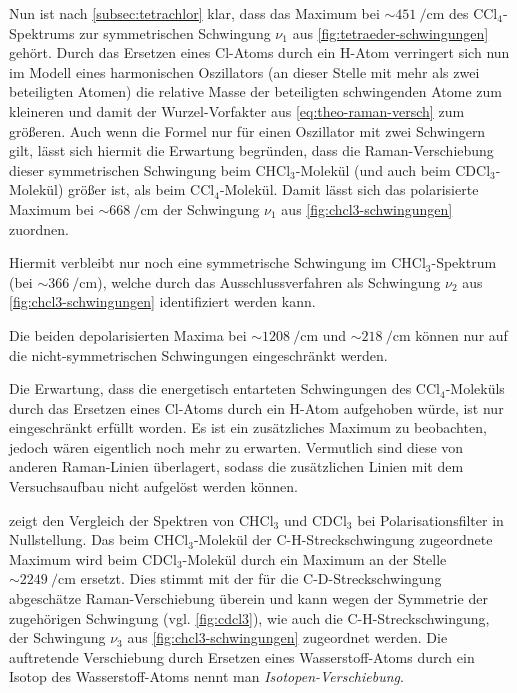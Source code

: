 \documentclass[../bericht.tex]{subfiles}
\begin{document}
        Nun ist nach \cref{subsec:tetrachlor} klar, dass das Maximum bei $\sim\SI{451}{\per\centi\meter}$ des $\mathrm{CCl_4}$-Spektrums zur symmetrischen Schwingung $\nu_1$ aus \cref{fig:tetraeder-schwingungen} gehört. Durch das Ersetzen eines Cl-Atoms durch ein H-Atom verringert sich nun im Modell eines harmonischen Oszillators (an dieser Stelle mit mehr als zwei beteiligten Atomen) die relative Masse der beteiligten schwingenden Atome zum kleineren und damit der Wurzel-Vorfakter aus \cref{eq:theo-raman-versch} zum größeren. Auch wenn die Formel nur für einen Oszillator mit zwei Schwingern gilt, lässt sich hiermit die Erwartung begründen, dass die Raman-Verschiebung dieser symmetrischen Schwingung beim $\mathrm{CHCl_3}$-Molekül (und auch beim $\mathrm{CDCl_3}$-Molekül) größer ist, als beim $\mathrm{CCl_4}$-Molekül. Damit lässt sich das polarisierte Maximum bei $\sim\SI{668}{\per\centi\meter}$ der Schwingung $\nu_1$ aus \cref{fig:chcl3-schwingungen} zuordnen.

        Hiermit verbleibt nur noch eine symmetrische Schwingung im $\mathrm{CHCl_3}$-Spektrum (bei $\sim\SI{366}{\per\centi\meter}$), welche durch das Ausschlussverfahren als Schwingung $\nu_2$ aus \cref{fig:chcl3-schwingungen} identifiziert werden kann.

        Die beiden depolarisierten Maxima bei $\sim\SI{1208}{\per\centi\meter}$ und $\sim\SI{218}{\per\centi\meter}$ können nur auf die nicht-symmetrischen Schwingungen eingeschränkt werden.

        Die Erwartung, dass die energetisch entarteten Schwingungen des $\mathrm{CCl_4}$-Moleküls durch das Ersetzen eines Cl-Atoms durch ein H-Atom aufgehoben würde, ist nur eingeschränkt erfüllt worden. Es ist ein zusätzliches Maximum zu beobachten, jedoch wären eigentlich noch mehr zu erwarten. Vermutlich sind diese von anderen Raman-Linien überlagert, sodass die zusätzlichen Linien mit dem Versuchsaufbau nicht aufgelöst werden können.
        \medskip

         zeigt den Vergleich der Spektren von $\mathrm{CHCl_3}$ und $\mathrm{CDCl_3}$ bei Polarisationsfilter in Nullstellung. Das beim $\mathrm{CHCl_3}$-Molekül der C-H-Streckschwingung zugeordnete Maximum wird beim $\mathrm{CDCl_3}$-Molekül durch ein Maximum an der Stelle $\sim\SI{2249}{\per\centi\meter}$ ersetzt. Dies stimmt mit der für die C-D-Streckschwingung abgeschätze Raman-Verschiebung überein und kann wegen der Symmetrie der zugehörigen Schwingung (vgl. \cref{fig:cdcl3}), wie auch die C-H-Streckschwingung, der Schwingung $\nu_3$ aus \cref{fig:chcl3-schwingungen} zugeordnet werden. Die auftretende Verschiebung durch Ersetzen eines Wasserstoff-Atoms durch ein Isotop des Wasserstoff-Atoms nennt man \textit{Isotopen-Verschiebung}.
\end{document}
